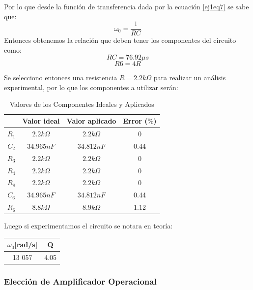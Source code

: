 Por lo que desde la función de transferencia dada por la ecuación \ref{ej1eq7} se sabe que:
$$\omega_0 = \frac{1}{RC}$$
Entonces obtenemos la relación que deben tener los componentes del circuito como:
$$RC = 76. 92\mu s$$
$$R6 = 4R$$

Se selecciono entonces una resistencia $R = 2.2k\Omega$ para realizar un análisis experimental, por lo que los componentes a utilizar serán:
\begin{table}[H]
	\centering
	\begin{tabular}{|c|c|c|c|}
		\hline
		           		& Valor ideal                              & Valor aplicado                      	& Error ($\%$) 	\\ \hline \hline
		$R_1$      		& $2.2k\Omega$                        & $2.2k\Omega$                       	& 0            	\\ \hline
		$C_2$      		& $34.965nF$				& $34.812nF$               		& 0.44         	\\ \hline
		$R_3$      		& $2.2k\Omega$                        & $2.2k\Omega$                       & 0            	\\ \hline
		$R_4$      		& $2.2k\Omega$                        & $2.2k\Omega$                       & 0            	\\ \hline
		$R_8$      		& $2.2k\Omega$                        & $2.2k\Omega$                       & 0            	\\ \hline
		$C_6$      		& $34.965nF$ 				& $34.812nF$               		& 0.44         	\\ \hline
		$R_6$      		& $8.8k\Omega$                      	& $8.9k\Omega$       			& 1.12            	\\ \hline
	\end{tabular}
	\caption{Valores de los Componentes Ideales y Aplicados}
\end{table}
Luego si experimentamos el circuito se notara en teoría:
\begin{table}[h]
\centering
\begin{tabular}{cc}
\hline
$\omega_0${[}rad/s{]} & Q    \\ \hline
13 057        & 4.05 \\ \hline
\end{tabular}
\end{table}

\subsubsection{Elección de Amplificador Operacional}

